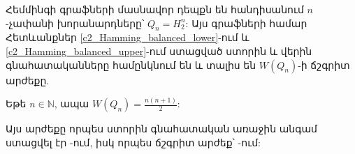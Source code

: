 Հեմմինգի գրաֆների մասնավոր դեպքն են հանդիսանում $n$-չափանի խորանարդները՝ $Q_n = H_2^n$: Այս գրաֆների համար Հետևանքներ \ref{c2_Hamming_balanced_lower}-ում և \ref{c2_Hamming_balanced_upper}-ում ստացված ստորին և վերին գնահատականները համընկնում են և տալիս են $W(Q_n)$-ի ճշգրիտ արժեքը.

\begin{corollary}
\label{c2_n_cube} Եթե $n\in\mathbb{N}$, ապա $W\left(Q_{n}\right) = \frac{n(n+1)}{2}$:
\end{corollary}

Այս արժեքը որպես ստորին գնահատական առաջին անգամ ստացվել էր \cite{Petrosyan2010}-ում, իսկ որպես ճշգրիտ արժեք՝ \cite{PetrosyanKhachatrianTananyan2011,PetrosyanKhachatrianTananyan2013}-ում:
